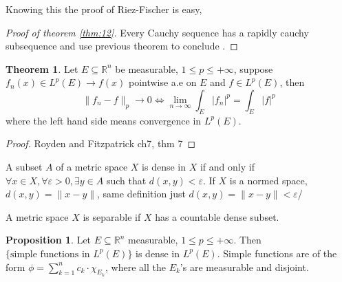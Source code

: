 \documentclass[12pt]{article}
\theoremstyle{definition}
\newtheorem{theorem}{Theorem}[section]
\newtheorem{proposition}{Proposition}[section]
\begin{document}
	Knowing this the proof of Riez-Fischer is easy, 
	\begin{proof}[Proof of theorem \ref{thm:12}]
		Every Cauchy sequence has a rapidly cauchy subsequence and use previous theorem to conclude .

	\end{proof}


	\begin{theorem}
		Let $E \subseteq \mathbb{R}^n$ be measurable, $1 \leq p \leq + \infty$, suppose $f_n(x) \in L^p(E) \to f(x)$ pointwise a.e on $E$ and $f \in L^p(E)$, then 
		$$ \|f_n - f\|_p \to 0 \iff \lim_{n \to \infty} \int_{E} |f_n|^p = \int_{E} |f|^p$$
		where the left hand side means convergence in $L^p (E)$.

	\end{theorem}
	\begin{proof}
		Royden and Fitzpatrick ch7, thm 7
	\end{proof}

	A subset $A$ of a metric space $X$ is dense in $X$ if and only if $\forall x \in X, \forall \varepsilon > 0, \exists y \in A$ such that $d(x,y) < \varepsilon$. If $X$ is a normed space, $d(x,y) = \|x-y\|$, same definition just $d(x,y) = \|x-y\| < \varepsilon$/

	A metric space $X$ is separable if $X$ has a countable dense subset.

	\begin{proposition}
		Let $E \subseteq \mathbb{R}^n $ measurable, $1 \leq p \leq + \infty$. Then $\{\text{simple functions in $L^p(E)$}\}$ is dense in $L^p(E)$. Simple functions are of the form $\phi = \sum_{k=1}^n c_k \cdot \chi_{E_k}$, where all the $E_k$'s are measurable and disjoint.
	\end{proposition}
\end{document}
